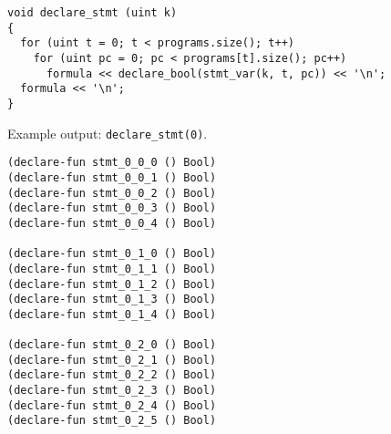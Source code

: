 






\begin{lstlisting}[style=c++]
void declare_stmt (uint k)
{
  for (uint t = 0; t < programs.size(); t++)
    for (uint pc = 0; pc < programs[t].size(); pc++)
      formula << declare_bool(stmt_var(k, t, pc)) << '\n';
  formula << '\n';
}
\end{lstlisting}

\noindent
Example output: \lstinline[style=c++]{declare_stmt(0)}.

\begin{lstlisting}[language=SMTLib]
(declare-fun stmt_0_0_0 () Bool)
(declare-fun stmt_0_0_1 () Bool)
(declare-fun stmt_0_0_2 () Bool)
(declare-fun stmt_0_0_3 () Bool)
(declare-fun stmt_0_0_4 () Bool)

(declare-fun stmt_0_1_0 () Bool)
(declare-fun stmt_0_1_1 () Bool)
(declare-fun stmt_0_1_2 () Bool)
(declare-fun stmt_0_1_3 () Bool)
(declare-fun stmt_0_1_4 () Bool)

(declare-fun stmt_0_2_0 () Bool)
(declare-fun stmt_0_2_1 () Bool)
(declare-fun stmt_0_2_2 () Bool)
(declare-fun stmt_0_2_3 () Bool)
(declare-fun stmt_0_2_4 () Bool)
(declare-fun stmt_0_2_5 () Bool)
\end{lstlisting}

